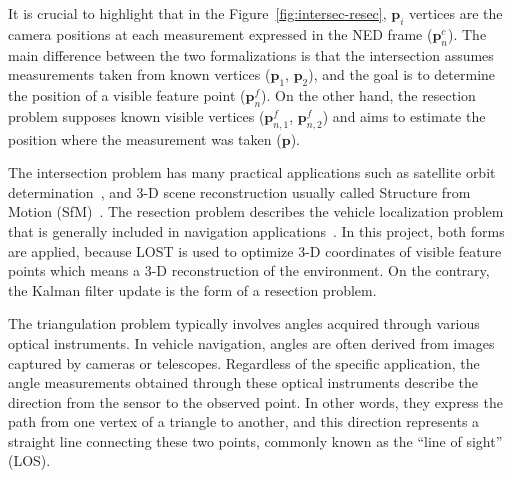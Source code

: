It is crucial to highlight that in the Figure~\ref{fig:intersec-resec}, $\mathbf{p}_i$ vertices are the camera positions at each measurement expressed in the NED frame ($\mathbf{p}_n^c$). The main difference between the two formalizations is that the intersection assumes measurements taken from known vertices ($\mathbf{p}_1$, $\mathbf{p}_2$), and the goal is to determine the position of a visible feature point ($\mathbf{p}_n^f$). On the other hand, the resection problem supposes known visible vertices ($\mathbf{p}_{n, 1}^f$, $\mathbf{p}_{n, 2}^f$) and aims to estimate the position where the measurement was taken ($\mathbf{p}$).

The intersection problem has many practical applications such as satellite orbit determination~\cite{TriagulationSpaceOrb1, TriagulationSpaceOrb2}, and 3-D scene reconstruction usually called Structure from Motion (SfM)~\cite{Triang3D1, Triang3D2, Triang3D3}. The resection problem describes the vehicle localization problem that is generally included in navigation applications~\cite{rel-nav-1, rel-nav-2, TriangNav}. In this project, both forms are applied, because LOST is used to optimize 3-D coordinates of visible feature points which means a 3-D reconstruction of the environment. On the contrary, the Kalman filter update is the form of a resection problem.

The triangulation problem typically involves angles acquired through various optical instruments. In vehicle navigation, angles are often derived from images captured by cameras or telescopes. Regardless of the specific application, the angle measurements obtained through these optical instruments describe the direction from the sensor to the observed point. In other words, they express the path from one vertex of a triangle to another, and this direction represents a straight line connecting these two points, commonly known as the ``line of sight'' (LOS).

